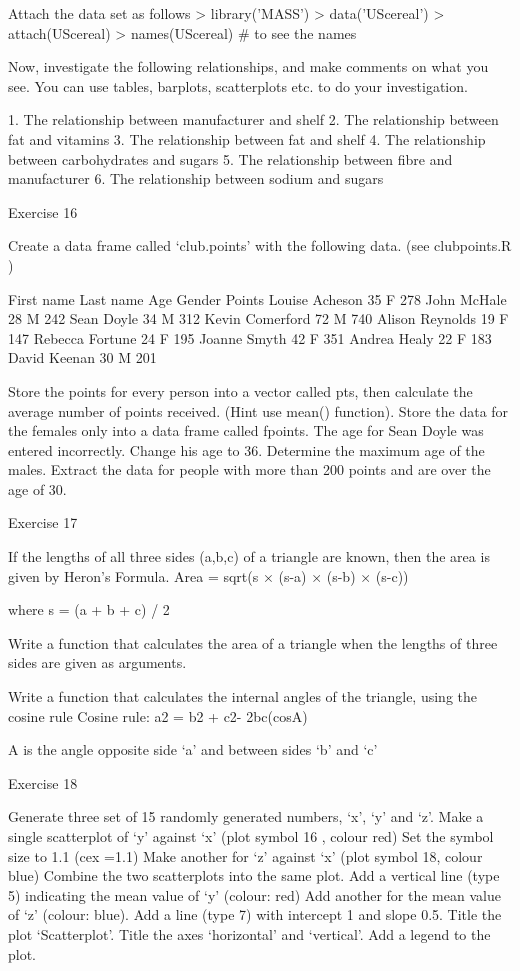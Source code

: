Attach the data set as follows
> library('MASS')
> data('UScereal')
> attach(UScereal)
> names(UScereal)         # to see the names
 
Now, investigate the following relationships, and make comments on what you see. You can use tables, barplots, scatterplots etc. to do your investigation.
 
1. The relationship between manufacturer and shelf
2. The relationship between fat and vitamins
3. The relationship between fat and shelf
4. The relationship between carbohydrates and sugars
5. The relationship between fibre and manufacturer
6. The relationship between sodium and sugars
 
Exercise 16
 
Create a data frame called ‘club.points’ with the following data. (see clubpoints.R )
 
First name
Last name
Age
Gender
Points
Louise
Acheson
35
F
278
John
McHale
28
M
242
Sean
Doyle
34
M
312
Kevin
Comerford
72
M
740
Alison
Reynolds
19
F
147
Rebecca
Fortune
24
F
195
Joanne
Smyth
42
F
351
Andrea
Healy
22
F
183
David
Keenan
30
M
201
 
Store the points for every person into a vector called pts, then calculate the average number of points received. (Hint use mean() function).
Store the data for the females only into a data frame called fpoints.
The age for Sean Doyle was entered incorrectly. Change his age to 36.
Determine the maximum age of the males.
Extract the data for people with more than 200 points and are over the age of 30.
 
Exercise 17
 
If the lengths of all three sides (a,b,c) of a triangle are known, then the area is given by Heron's Formula.
Area = sqrt(s × (s-a) × (s-b) × (s-c))
 
where s = (a + b + c) / 2
 
Write a function that calculates the area of a triangle when the lengths of three sides are given as arguments.
 
Write a function that calculates the internal angles of the triangle, using the cosine rule
Cosine rule: a2 = b2 + c2- 2bc(cosA)
 
A is the angle opposite side ‘a’ and between sides ‘b’ and ‘c’
 
Exercise 18
 
Generate three set of 15 randomly generated numbers, ‘x’, ‘y’ and ‘z’.
Make a single scatterplot of ‘y’ against ‘x’               (plot symbol 16 , colour red)
Set the symbol size to 1.1            	          	             (cex =1.1)
Make another for ‘z’ against ‘x’            	             (plot symbol 18, colour blue)
Combine the two scatterplots into the same plot.
Add a vertical line (type 5) indicating the mean value of ‘y’ (colour: red)
Add another for the mean value of ‘z’                (colour: blue).
Add a line (type 7) with intercept 1 and slope 0.5.
Title the plot ‘Scatterplot’.
Title the axes ‘horizontal’ and ‘vertical’.
Add a legend to the plot.
 
